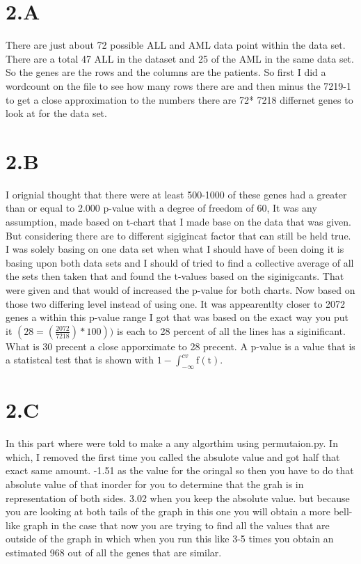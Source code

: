 \documentclass[12pt]{article}
\begin{document}
\begin{itemize}
\part{2.A}
 There are just about 72 possible ALL and AML data point within the data set. There are a total 47 ALL in the dataset  and 25 of the AML in the same data set. So the genes are the rows and the columns are the patients. So first I did a wordcount on the file to see how many rows there are and then minus the 7219-1 to get a close approximation to the numbers there are 72* 7218 differnet genes to look at for the data set.

\part{2.B}
		I orignial thought that there were at least 500-1000 of these genes had a greater than or equal to 2.000 p-value with a degree of freedom of 60, It was any assumption, made based on t-chart that I made base on the data that was given. But considering there are to different sigigincat factor that can still be held true. I was solely basing on one data set when what I should have of been doing it is basing upon both data sets and I should of tried to find a collective average of all the sets then taken that and found the t-values based on the siginigcants. That were given and that would of increased the p-value for both charts. Now based on those two differing level instead of using one. It was  appearentlty closer to 2072 genes a within this p-value range I got that was based on  the exact way you put it $(28=(\frac{2072}{7218})*100))$ is each to 28 percent of all the lines has a siginificant. What is 30 precent a close apporximate to 28 precent. A p-value is a value that is a statistcal test that is shown with $1 - \int_{-\infty}^{cv} \mathrm{f(t)}$. 

\part{2.C}
    In this part where were told to make a any algorthim using permutaion.py. In which, I removed the first time you called the absulote value and got half that exact same amount. -1.51 as the value for the oringal so then you have to do that absolute value of that inorder for you to determine that the grah is in representation of both sides. 3.02 when you keep the absolute value. but because you are looking at both tails of the graph in this one you will obtain a more bell-like graph in the case that now you are trying to find all the values that are outside of the graph in which when  you run this like 3-5 times you obtain an estimated 968 out of all the genes that are similar. 

\end{itemize}
\end{document}
